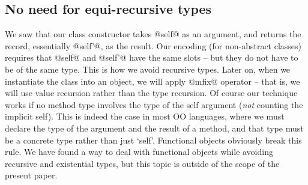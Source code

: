 


\subsection{No need for equi-recursive types}

We saw that our class constructor takes @self@ as an argument, and
returns the record, essentially @self'@, as the result. Our encoding
(for non-abstract classes) requires that @self@ and @self'@ have the
same slots -- but they do not have to be of the same type. This is how
we avoid recursive types. Later on, when we instantiate the class into
an object, we will apply @mfix@ operator -- that is, we will use value
recursion rather than the type recursion. Of course our technique
works if no method type involves the type of the self argument
(\emph{not} counting the implicit self). This is indeed the case in
most OO languages, where we must declare the type of the argument and
the result of a method, and that type must be a concrete type rather
than just `self'.  Functional objects obviously break this rule. We
have found a way to deal with functional objects while avoiding
recursive and existential types, but this topic is outside of the
scope of the present paper.



